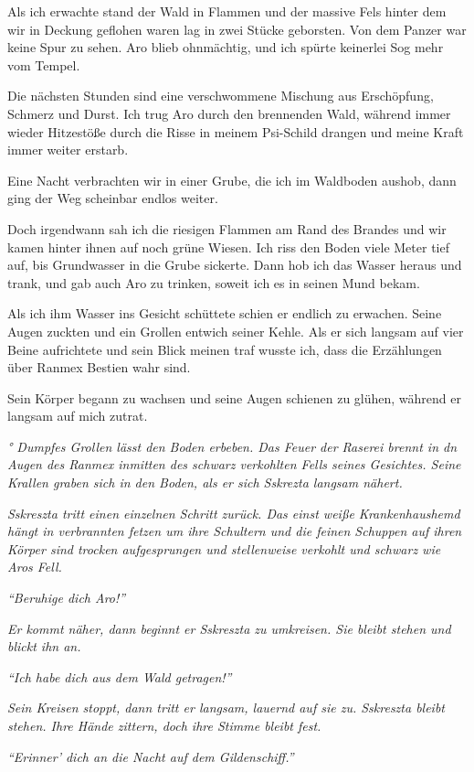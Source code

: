 \documentclass[11pt]{article}
\begin{document}
Als ich erwachte stand der Wald in Flammen und der massive Fels hinter
dem wir in Deckung geflohen waren lag in zwei Stücke geborsten. Von dem
Panzer war keine Spur zu sehen. Aro blieb ohnmächtig, und ich spürte
keinerlei Sog mehr vom Tempel.

Die nächsten Stunden sind eine verschwommene Mischung aus Erschöpfung,
Schmerz und Durst. Ich trug Aro durch den brennenden Wald, während immer
wieder Hitzestöße durch die Risse in meinem Psi-Schild drangen und meine
Kraft immer weiter erstarb.

Eine Nacht verbrachten wir in einer Grube, die ich im Waldboden aushob,
dann ging der Weg scheinbar endlos weiter.

Doch irgendwann sah ich die riesigen Flammen am Rand des Brandes und wir
kamen hinter ihnen auf noch grüne Wiesen. Ich riss den Boden viele Meter
tief auf, bis Grundwasser in die Grube sickerte. Dann hob ich das Wasser
heraus und trank, und gab auch Aro zu trinken, soweit ich es in seinen
Mund bekam.

Als ich ihm Wasser ins Gesicht schüttete schien er endlich zu erwachen.
Seine Augen zuckten und ein Grollen entwich seiner Kehle. Als er sich
langsam auf vier Beine aufrichtete und sein Blick meinen traf wusste
ich, dass die Erzählungen über Ranmex Bestien wahr sind.

Sein Körper begann zu wachsen und seine Augen schienen zu glühen,
während er langsam auf mich zutrat.

\emph{° Dumpfes Grollen lässt den Boden erbeben. Das Feuer der Raserei
brennt in dn Augen des Ranmex inmitten des schwarz verkohlten Fells
seines Gesichtes. Seine Krallen graben sich in den Boden, als er sich
Sskrezta langsam nähert.}

\emph{Sskreszta tritt einen einzelnen Schritt zurück. Das einst weiße
Krankenhaushemd hängt in verbrannten fetzen um ihre Schultern und die
feinen Schuppen auf ihren Körper sind trocken aufgesprungen und
stellenweise verkohlt und schwarz wie Aros Fell.}

\emph{``Beruhige dich Aro!''}

\emph{Er kommt näher, dann beginnt er Sskreszta zu umkreisen. Sie bleibt
stehen und blickt ihn an.}

\emph{``Ich habe dich aus dem Wald getragen!''}

\emph{Sein Kreisen stoppt, dann tritt er langsam, lauernd auf sie zu.
Sskreszta bleibt stehen. Ihre Hände zittern, doch ihre Stimme bleibt
fest.}

\emph{``Erinner' dich an die Nacht auf dem Gildenschiff.''}
\end{document}
